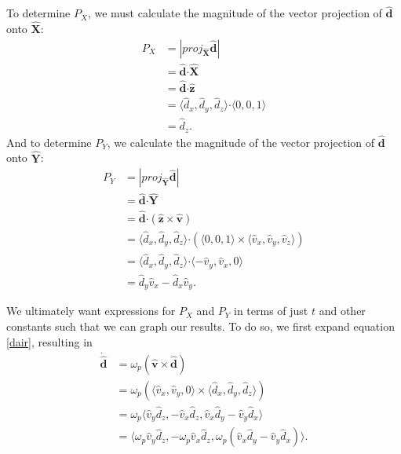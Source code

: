 \documentclass{article}
\begin{document}
To determine $P_X$, we must calculate the magnitude of the vector projection of $\mathbf{\hat{d}}$ onto $\mathbf{\hat{X}}$:
\begin{equation}\label{P_X}
    \begin{split}
        P_X &= |proj_{\mathbf{\hat{X}}}\mathbf{\hat{d}}| \\
        &= \mathbf{\hat{d}} \boldsymbol{\cdot} \mathbf{\hat{X}} \\
        &= \mathbf{\hat{d}} \boldsymbol{\cdot} \mathbf{\hat{z}} \\
        &= \langle \hat{d}_x,\hat{d}_y,\hat{d}_z \rangle \boldsymbol{\cdot} \langle 0,0,1 \rangle \\
        &= \hat{d}_z\text{.}
    \end{split}
\end{equation}
And to determine $P_Y$, we calculate the magnitude of the vector projection of $\mathbf{\hat{d}}$ onto $\mathbf{\hat{Y}}$:
\begin{equation}\label{P_Y}
    \begin{split}
        P_Y &= |proj_{\mathbf{\hat{Y}}}\mathbf{\hat{d}}| \\
        &= \mathbf{\hat{d}} \boldsymbol{\cdot} \mathbf{\hat{Y}} \\
        &= \mathbf{\hat{d}} \boldsymbol{\cdot} (\mathbf{\hat{z}} \times \mathbf{\hat{v}}) \\
        &= \langle \hat{d}_x,\hat{d}_y,\hat{d}_z \rangle \boldsymbol{\cdot} (\langle 0,0,1 \rangle \times \langle \hat{v}_x,\hat{v}_y,\hat{v}_z \rangle) \\
        &= \langle \hat{d}_x,\hat{d}_y,\hat{d}_z \rangle \boldsymbol{\cdot} \langle -\hat{v}_y,\hat{v}_x,0 \rangle \\
        &= \hat{d}_y\hat{v}_x - \hat{d}_x\hat{v}_y\text{.}
    \end{split}
\end{equation}

We ultimately want expressions for $P_X$ and $P_Y$ in terms of just $t$ and other constants such that we can graph our results. To do so, we first expand equation \ref{dair}, resulting in
\begin{equation}\label{dairexpanded}
    \begin{split}
        \mathbf{\dot{\hat{d}}} &= \omega_p(\mathbf{\hat{v}} \times \mathbf{\hat{d}}) \\
        &= \omega_p(\langle \hat{v}_x,\hat{v}_y,0 \rangle \times \langle \hat{d}_x,\hat{d}_y,\hat{d}_z \rangle) \\
        &= \omega_p\langle \hat{v}_y\hat{d}_z,-\hat{v}_x\hat{d}_z,\hat{v}_x\hat{d}_y-\hat{v}_y\hat{d}_x \rangle \\
        &= \langle \omega_p\hat{v}_y\hat{d}_z,-\omega_p\hat{v}_x\hat{d}_z,\omega_p(\hat{v}_x\hat{d}_y-\hat{v}_y\hat{d}_x) \rangle\text{.}
    \end{split}
\end{equation}
\end{document}
